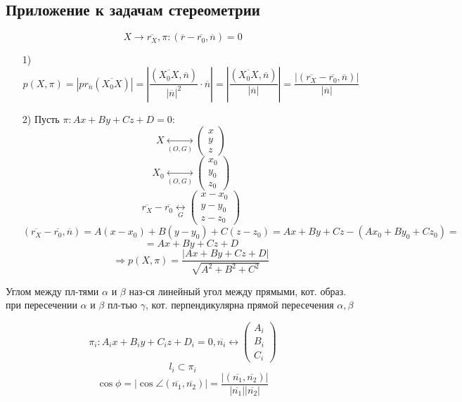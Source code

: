 \subsection{Приложение к задачам стереометрии}
\begin{task}
  \[
    X \rightarrow \overline{r_X}, \pi \colon (\overline{r} - \overline{r_0}, \overline{n}) = 0
  \]
  \begin{itemize}
    \item [1) ]
  \[
    p(X, \pi) = \left|pr_{\overline{n}}(\overline{X_0X})\right| = \left|\frac{(\overline{X_0X}, \overline{n})}{\left|\overline{n}\right|^{2}} \cdot \overline{n}\right| = \left|\frac{(\overline{X_0X}, \overline{n})}{|\overline{n}|}\right| = \frac{\left|(\overline{r_X} - \overline{r_0}, \overline{n})\right|}{\left|\overline{n}\right|}
  \]
    \item [2) ] Пусть $\pi \colon Ax + By + Cz + D = 0$: \\
      \[
      X \underset{(O, G)}{\longleftrightarrow} \begin{pmatrix}x \\ y \\ z \end{pmatrix}
      \]
      \[
      X_0 \underset{(O, G)}{\longleftrightarrow} \begin{pmatrix} x_0 \\ y_0 \\ z_0 \end{pmatrix}
      \]
      \[
      \overline{r_X} - \overline{r_0} \underset{G}{\longleftrightarrow} \begin{pmatrix}x - x_0 \\ y - y_0 \\ z - z_0 \end{pmatrix}
      \]
      \[
        (\overline{r_X} - \overline{r_0}, \overline{n}) = A(x - x_0) + B(y - y_0) + C(z - z_0) = Ax + By + Cz - (Ax_0 + By_0 + Cz_0) = 
      \]
      \[
      = Ax + By + Cz + D
      \]
      \[
      \Rightarrow p(X, \pi) = \frac{\left|Ax + By + Cz + D\right|}{\sqrt{A^{2} + B^{2} + C^{2}}}
      \]
  \end{itemize}
\end{task}
\begin{definition}
Углом между пл-тями $\alpha$ и $\beta$ наз-ся линейный угол между прямыми, кот. образ. при пересечении $\alpha$ и $\beta$ пл-тью $\gamma$, кот. перпендикулярна прямой пересечения $\alpha, \beta$
\end{definition}
\begin{task}
  \[
    \pi_i \colon A_i x + B_i y + C_i z + D_i = 0, \overline{n_i} \underset{}{\longleftrightarrow} \begin{pmatrix}A_i \\ B_i \\ C_i \end{pmatrix}
  \]
  \[
  l_i \subset \pi_i
  \]
  \[
  \cos \phi = \left|\cos \angle (\overline{n_1}, \overline{n_2})\right| = \frac{\left|(\overline{n_1}, \overline{n_2})\right|}{\left|\overline{n_1}\right| \left|\overline{n_2}\right|}
  \]
\end{task}
